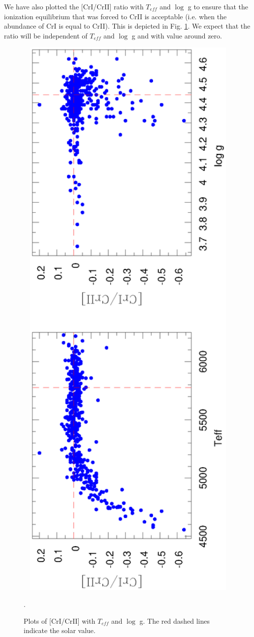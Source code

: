 \documentclass[dvips,12pt,a4paper]{report}
\begin{document}
{{We have also plotted the [CrI/CrII] ratio with $T_{eff}$ and $\log$ g to ensure that the ionization equilibrium that was forced to CrII is acceptable (i.e. when the abundance of CrI is equal to CrII). This is depicted in Fig. \ref{cr2cr1}. We expect that the ratio will be independent of $T_{eff}$ and $\log$ g and with value around zero. 

\begin{figure}[h!]
\centering
\includegraphics[angle=-90, trim=10mm 0mm 100mm 10mm, clip, width=12cm]{pics/parte3/CrICrII.eps}
\caption[Plots of CrI/CrII]{Plots of [CrI/CrII] with $T_{eff}$ and $\log$ g. The red dashed lines indicate the solar value.}.
\label{cr2cr1}
\end{figure}

}}
\end{document}
